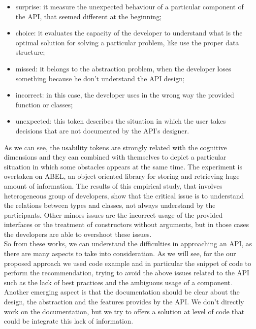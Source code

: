 \begin{itemize}
\item surprise: it measure the unexpected behaviour of a particular component of the API, that seemed different at the beginning;
\item choice: it evaluates the capacity of the developer to understand what is the optimal solution for solving a particular problem, like use the proper data structure;
\item missed: it belongs to the abstraction problem, when the developer loses something because he don't understand the API design;
\item incorrect: in this case, the developer uses in the wrong way the provided function or classes;
\item unexpected: this token describes the situation in which the user takes decisions that are not documented by the API's designer.
\end{itemize}
As we can see, the usability tokens are strongly related with the cognitive dimensions and they can combined with themselves to depict a particular situation in which some obstacles appears at the same time. The experiment is overtaken on ABEL, an object oriented library for storing and retrieving huge amount of information. The results of this empirical study, that involves heterogeneous group of developers, show that the critical issue is to understand the relations between types and classes, not always understand by the participants. Other minors issues are the incorrect usage of the provided interfaces or the treatment of constructors without arguments, but in those cases the developers are able to overshoot these issues. \\
So from these works, we can understand the difficulties in approaching an API, as there are many aspects to take into consideration. As we will see, for the our proposed approach we used code example and in particular the snippet of code to perform the recommendation, trying to avoid the above issues related to the API such as the lack of best practices and the ambiguous usage of a component. Another emerging aspect is that the documentation should be clear about the design, the abstraction and the features provides by the API. We don't directly work on the documentation, but we try to offers a solution at level of code that could be integrate this lack of information.



